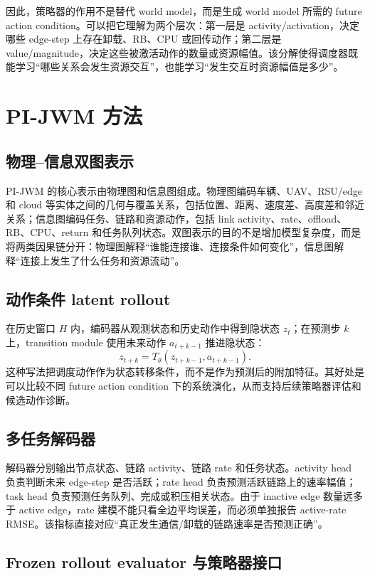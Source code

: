\documentclass[letterpaper,journal]{IEEEtran}
\newcommand{\pjwm}{PI-JWM}
\begin{document}
因此，策略器的作用不是替代 world model，而是生成 world model 所需的 future action condition。可以把它理解为两个层次：第一层是 activity/activation，决定哪些 edge-step 上存在卸载、RB、CPU 或回传动作；第二层是 value/magnitude，决定这些被激活动作的数量或资源幅值。该分解使得调度器既能学习“哪些关系会发生资源交互”，也能学习“发生交互时资源幅值是多少”。

\section{PI-JWM 方法}

\subsection{物理--信息双图表示}

\pjwm{} 的核心表示由物理图和信息图组成。物理图编码车辆、UAV、RSU/edge 和 cloud 等实体之间的几何与覆盖关系，包括位置、距离、速度差、高度差和邻近关系；信息图编码任务、链路和资源动作，包括 link activity、rate、offload、RB、CPU、return 和任务队列状态。双图表示的目的不是增加模型复杂度，而是将两类因果链分开：物理图解释“谁能连接谁、连接条件如何变化”，信息图解释“连接上发生了什么任务和资源流动”。

\subsection{动作条件 latent rollout}

在历史窗口 $H$ 内，编码器从观测状态和历史动作中得到隐状态 $z_t$；在预测步 $k$ 上，transition module 使用未来动作 $a_{t+k-1}$ 推进隐状态：
\[
z_{t+k}=T_\theta(z_{t+k-1},a_{t+k-1}).
\]
这种写法把调度动作作为状态转移条件，而不是作为预测后的附加特征。其好处是可以比较不同 future action condition 下的系统演化，从而支持后续策略器评估和候选动作诊断。

\subsection{多任务解码器}

解码器分别输出节点状态、链路 activity、链路 rate 和任务状态。activity head 负责判断未来 edge-step 是否活跃；rate head 负责预测活跃链路上的速率幅值；task head 负责预测任务队列、完成或积压相关状态。由于 inactive edge 数量远多于 active edge，rate 建模不能只看全边平均误差，而必须单独报告 active-rate RMSE。该指标直接对应“真正发生通信/卸载的链路速率是否预测正确”。

\subsection{Frozen rollout evaluator 与策略器接口}
\end{document}
